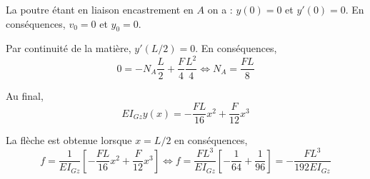\documentclass[10pt,fleqn]{article} %
\begin{document}
\begin{corrige}
La poutre étant en liaison encastrement en $A$ on a : $y(0)=0$ et $y'(0)=0$.
En conséquences, $v_0=0$ et $y_0=0$.

Par continuité de la matière, $y'(L/2)=0$. En conséquences, 
$$ 0 =  -N_A \dfrac{L}{2}+\dfrac{F}{4}\dfrac{L^2}{4}
\Leftrightarrow N_A  = \dfrac{FL}{8}
 $$

Au final, 
$$ 
 EI_{Gz}y(x) = -  \dfrac{FL}{16} x^2+\dfrac{F}{12}x^3 
$$

La flèche est obtenue lorsque $x = L/2$ en conséquences, 
$$
f = \dfrac{1}{ EI_{Gz}}\left[  - \dfrac{FL}{16} x^2+\dfrac{F}{12}x^3 \right]
\Leftrightarrow 
f = \dfrac{FL^3}{ EI_{Gz}}\left[  - \dfrac{1}{64} +\dfrac{1}{96} \right] =  - \dfrac{FL^3}{192 EI_{Gz}}
$$


$$
$$
\end{corrige}
\else
\fi
\end{document}
